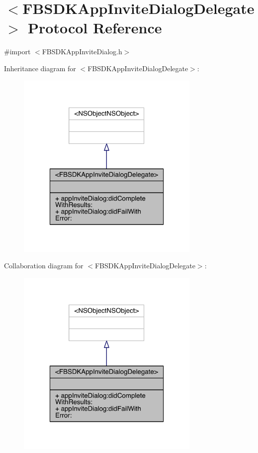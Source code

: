 \hypertarget{protocol_f_b_s_d_k_app_invite_dialog_delegate-p}{\section{$<$F\-B\-S\-D\-K\-App\-Invite\-Dialog\-Delegate$>$ Protocol Reference}
\label{protocol_f_b_s_d_k_app_invite_dialog_delegate-p}
}


{\ttfamily \#import $<$F\-B\-S\-D\-K\-App\-Invite\-Dialog.\-h$>$}



Inheritance diagram for $<$F\-B\-S\-D\-K\-App\-Invite\-Dialog\-Delegate$>$\-:
\nopagebreak
\begin{figure}[H]
\begin{center}
\leavevmode
\includegraphics[width=250pt]{protocol_f_b_s_d_k_app_invite_dialog_delegate-p__inherit__graph}
\end{center}
\end{figure}


Collaboration diagram for $<$F\-B\-S\-D\-K\-App\-Invite\-Dialog\-Delegate$>$\-:
\nopagebreak
\begin{figure}[H]
\begin{center}
\leavevmode
\includegraphics[width=250pt]{protocol_f_b_s_d_k_app_invite_dialog_delegate-p__coll__graph}
\end{center}
\end{figure}
